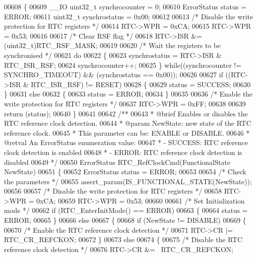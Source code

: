 \begin{DoxyCode}
00608 \{
00609   \_\_IO uint32\_t synchrocounter = 0;
00610   ErrorStatus status = ERROR;
00611   uint32\_t synchrostatus = 0x00;
00612 
00613   \textcolor{comment}{/* Disable the write protection for RTC registers */}
00614   RTC->WPR = 0xCA;
00615   RTC->WPR = 0x53;
00616 
00617   \textcolor{comment}{/* Clear RSF flag */}
00618   RTC->ISR &= (uint32\_t)RTC_RSF_MASK;
00619 
00620   \textcolor{comment}{/* Wait the registers to be synchronised */}
00621   \textcolor{keywordflow}{do}
00622   \{
00623     synchrostatus = RTC->ISR & RTC_ISR_RSF;
00624     synchrocounter++;
00625   \} \textcolor{keywordflow}{while}((synchrocounter != SYNCHRO_TIMEOUT) && (synchrostatus == 0x00));
00626 
00627   \textcolor{keywordflow}{if} ((RTC->ISR & RTC_ISR_RSF) != RESET)
00628   \{
00629     status = SUCCESS;
00630   \}
00631   \textcolor{keywordflow}{else}
00632   \{
00633     status = ERROR;
00634   \}
00635 
00636   \textcolor{comment}{/* Enable the write protection for RTC registers */}
00637   RTC->WPR = 0xFF;
00638 
00639   \textcolor{keywordflow}{return} (status);
00640 \}
00641 
00642 \textcolor{comment}{/**}
00643 \textcolor{comment}{  * @brief  Enables or disables the RTC reference clock detection.}
00644 \textcolor{comment}{  * @param  NewState: new state of the RTC reference clock.}
00645 \textcolor{comment}{  *          This parameter can be: ENABLE or DISABLE.}
00646 \textcolor{comment}{  * @retval An ErrorStatus enumeration value:}
00647 \textcolor{comment}{  *          - SUCCESS: RTC reference clock detection is enabled}
00648 \textcolor{comment}{  *          - ERROR: RTC reference clock detection is disabled  }
00649 \textcolor{comment}{  */}
00650 ErrorStatus RTC_RefClockCmd(FunctionalState NewState)
00651 \{
00652   ErrorStatus status = ERROR;
00653 
00654   \textcolor{comment}{/* Check the parameters */}
00655   assert_param(IS\_FUNCTIONAL\_STATE(NewState));
00656 
00657   \textcolor{comment}{/* Disable the write protection for RTC registers */}
00658   RTC->WPR = 0xCA;
00659   RTC->WPR = 0x53;
00660 
00661   \textcolor{comment}{/* Set Initialization mode */}
00662   \textcolor{keywordflow}{if} (RTC_EnterInitMode() == ERROR)
00663   \{
00664     status = ERROR;
00665   \}
00666   \textcolor{keywordflow}{else}
00667   \{
00668     \textcolor{keywordflow}{if} (NewState != DISABLE)
00669     \{
00670       \textcolor{comment}{/* Enable the RTC reference clock detection */}
00671       RTC->CR |= RTC_CR_REFCKON;
00672     \}
00673     \textcolor{keywordflow}{else}
00674     \{
00675       \textcolor{comment}{/* Disable the RTC reference clock detection */}
00676       RTC->CR &= ~RTC_CR_REFCKON;

\end{DoxyCode}
